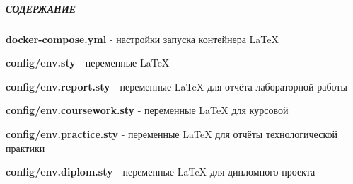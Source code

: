 \documentclass[12pt, a4paper, simple]{eskdtext}
\begin{document}
  

  \thispagestyle{fancyStyleWithCodeOnTopFirstPage}
  \pagestyle{fancyStyleWithCodeOnTop}

  \subparagraph{СОДЕРЖАНИЕ} \hspace{0pt}

  \textbf{docker-compose.yml} - настройки запуска контейнера LaTeX

  \textbf{config/env.sty} - переменные LaTeX

  \textbf{config/env.report.sty} - переменные LaTeX для отчёта лабораторной работы

  \textbf{config/env.coursework.sty} - переменные LaTeX для курсовой

  \textbf{config/env.practice.sty} - переменные LaTeX для отчёты технологической практики

  \textbf{config/env.diplom.sty} - переменные LaTeX для дипломного проекта

  \newpage
  

  

  

  \newpage
  

  \newpage
  

  \newpage
  
\end{document}
